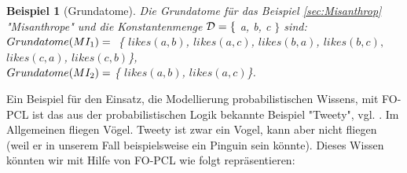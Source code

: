 \documentclass[a4paper, 11pt]{book}
\newtheorem{Bsp}{Beispiel}[section]
\begin{document}
\begin{Bsp}[Grundatome]
Die Grundatome für das Beispiel \ref{sec:Misanthrop} "{}Misanthrope"{} und die Konstantenmenge $ \cal{D} = \{$ a, b, c $\} $  sind:\\
$ Grundatome(MI_{1}) = \\ $  \{ $likes(a, b) $, $likes(a, c) $, $likes(b, a) $, $likes(b, c),  $ $likes(c, a)$, $likes(c, b) $\}, \\$Grundatome(MI_{2}) =\\ $\{ $likes(a, b)  $, $likes(a, c)  $\}. \\
	
	
\end{Bsp}
\newpage

Ein Beispiel für den Einsatz, die Modellierung probabilistischen Wissens, mit FO-PCL ist das aus der probabilistischen Logik bekannte Beispiel "{}Tweety"{}, vgl. \cite[Bsp. 8.30, S. 261]{BKI08}. Im Allgemeinen fliegen Vögel. Tweety ist zwar ein Vogel, kann aber nicht fliegen (weil er in unserem Fall beispielsweise ein Pinguin sein könnte). Dieses Wissen könnten wir mit Hilfe von FO-PCL wie folgt repräsentieren:
\end{document}
